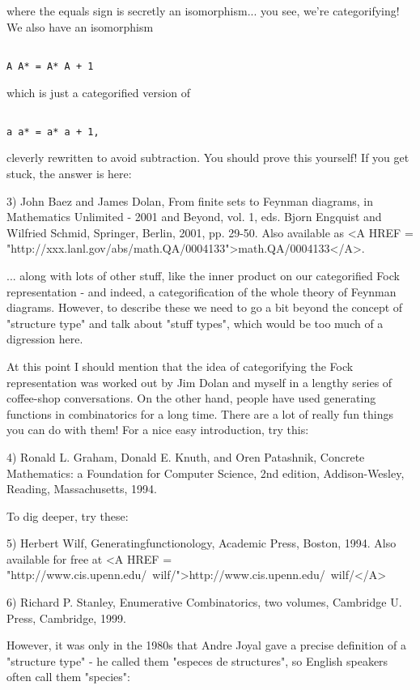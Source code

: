 where the equals sign is secretly an isomorphism... you see, we're
categorifying!  We also have an isomorphism


\begin{verbatim}

A A* = A* A + 1
\end{verbatim}
    
which is just a categorified version of 


\begin{verbatim}

a a* = a* a + 1,
\end{verbatim}
    
cleverly rewritten to avoid subtraction.   You should prove this 
yourself!  If you get stuck, the answer is here:

3) John Baez and James Dolan, From finite sets to Feynman diagrams,
in Mathematics Unlimited - 2001 and Beyond, vol. 1, eds. Bjorn
Engquist and Wilfried Schmid, Springer, Berlin, 2001, pp. 29-50. 
Also available as <A HREF = "http://xxx.lanl.gov/abs/math.QA/0004133">math.QA/0004133</A>.

... along with lots of other stuff, like the inner product on our
categorified Fock representation - and indeed, a categorification of 
the whole theory of Feynman diagrams.  However, to describe these we 
need to go a bit beyond the concept of "structure type" and
talk about
"stuff types", which would be too much of a digression here.

At this point I should mention that the idea of categorifying the Fock
representation was worked out by Jim Dolan and myself in a lengthy
series of coffee-shop conversations.   On the other hand, people have
used generating functions in combinatorics for a long time.  There
are a lot of really fun things you can do with them!  For a nice easy
introduction, try this:

4)  Ronald L. Graham, Donald E. Knuth, and Oren Patashnik,
Concrete Mathematics: a Foundation for Computer Science, 
2nd edition, Addison-Wesley, Reading, Massachusetts, 1994.

To dig deeper, try these:

5) Herbert Wilf, Generatingfunctionology, Academic Press, Boston,
1994. Also available for free at <A HREF = "http://www.cis.upenn.edu/~wilf/">http://www.cis.upenn.edu/~wilf/</A>

6) Richard P. Stanley, Enumerative Combinatorics, two volumes, 
Cambridge U. Press, Cambridge, 1999.

However, it was only in the 1980s that Andre Joyal gave a precise
definition of a "structure type" - he called them "especes de structures",
so English speakers often call them "species":

